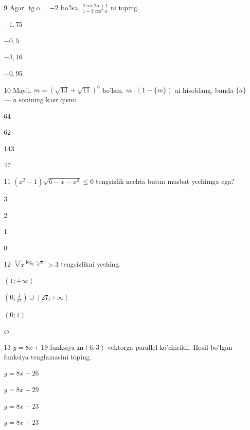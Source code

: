 \documentclass[14pt]{article}
\newcommand{\tg}{\operatorname{tg}}
\begin{document}
\begin{questionbox}{9}
    Agar \(\tg \alpha = -2\) bo'lsa, \(\frac{2\cos 2\alpha + 1}{1 - 3\cos^2 \alpha}\) ni toping.
    \begin{options}
        \item \(-1{,}75\)
        \item \(-0{,}5\)
        \item \(-3{,}16\)
        \item \(-0{,}95\)
    \end{options}
\end{questionbox}

\begin{questionbox}{10}
    Mayli, \(m = (\sqrt{13} + \sqrt{11})^6\) bo'lsin. \(m \cdot (1 - \{m\})\) ni hisoblang, bunda \(\{a\}\) — \(a\) sonining kasr qismi.
    \begin{options}
        \item 64
        \item 62
        \item 143
        \item 47
    \end{options}
\end{questionbox}

\begin{questionbox}{11}
    \((x^2 - 1)\sqrt{6 - x - x^2} \le 0\) tengsizlik nechta butun musbat yechimga ega?
    \begin{options}
        \item 3
        \item 2
        \item 1
        \item 0
    \end{options}
\end{questionbox}

\begin{questionbox}{12}
    \(\sqrt[3]{x^{\log_3 \sqrt[3]{x} }} > 3\) tengsizlikni yeching.
    \begin{options}
        \item \((1; +\infty)\)
        \item \((0; \frac{1}{27}) \cup (27; +\infty)\)
        \item \((0; 1)\)
        \item \(\varnothing\)
    \end{options}
\end{questionbox}

\begin{questionbox}{13}
    \(y = 8x + 19\) funksiya \(\mathbf{m}(6; 3)\) vektorga parallel ko'chirildi. Hosil bo'lgan funksiya tenglamasini toping.
    \begin{options}
        \item \(y = 8x - 26\)
        \item \(y = 8x - 29\)
        \item \(y = 8x - 23\)
        \item \(y = 8x + 23\)
    \end{options}
\end{questionbox}
\end{document}
